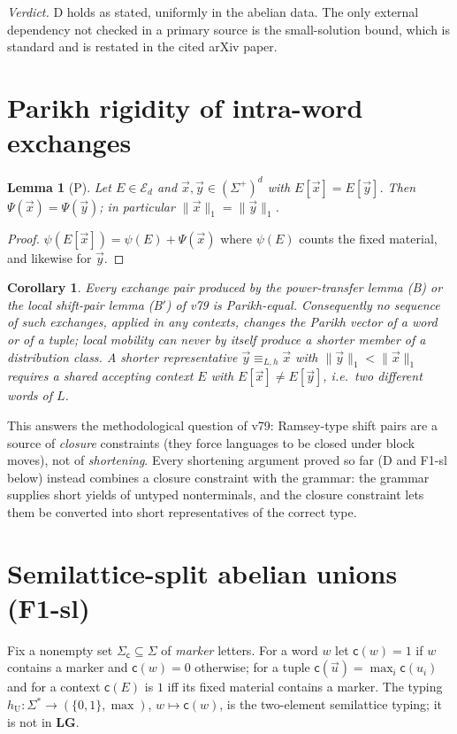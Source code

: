 \documentclass[11pt]{article}
\newtheorem{lemma}[theorem]{Lemma}
\newtheorem{corollary}[theorem]{Corollary}
\theoremstyle{definition}
\theoremstyle{remark}
\newcommand{\tuple}[1]{\vec{#1}}
\newcommand{\mk}{\mathsf c}
\begin{document}
\emph{Verdict.}  D holds as stated, uniformly in the abelian data.  The
only external dependency not checked in a primary source is the
small-solution bound, which is standard and is restated in the cited
arXiv paper.

\section{Parikh rigidity of intra-word exchanges}

\begin{lemma}[P]\label{lem:P}
Let $E\in\mathcal E_d$ and $\tuple x,\tuple y\in(\Sigma^+)^d$ with
$E[\tuple x]=E[\tuple y]$.  Then $\Psi(\tuple x)=\Psi(\tuple y)$; in
particular $\|\tuple x\|_1=\|\tuple y\|_1$.
\end{lemma}
\begin{proof}
$\psi(E[\tuple x])=\psi(E)+\Psi(\tuple x)$ where $\psi(E)$ counts the fixed
material, and likewise for $\tuple y$.
\end{proof}

\begin{corollary}\label{cor:P}
Every exchange pair produced by the power-transfer lemma (B) or the local
shift-pair lemma (B$'$) of v79 is Parikh-equal.  Consequently no sequence of
such exchanges, applied in any contexts, changes the Parikh vector of a
word or of a tuple; local mobility can never by itself produce a shorter
member of a distribution class.  A shorter representative
$\tuple y\equiv_{L,h}\tuple x$ with $\|\tuple y\|_1<\|\tuple x\|_1$ requires
a shared accepting context $E$ with $E[\tuple x]\neq E[\tuple y]$, i.e.\
\emph{two different words} of $L$.
\end{corollary}

This answers the methodological question of v79: Ramsey-type shift pairs are
a source of \emph{closure} constraints (they force languages to be closed
under block moves), not of \emph{shortening}.  Every shortening argument
proved so far (D and F1-sl below) instead combines a closure constraint with
the grammar: the grammar supplies short yields of untyped nonterminals, and
the closure constraint lets them be converted into short representatives of
the correct type.

\section{Semilattice-split abelian unions (F1-sl)}

Fix a nonempty set $\Sigma_{\mk}\subseteq\Sigma$ of \emph{marker} letters.
For a word $w$ let $\mk(w)=1$ if $w$ contains a marker and $\mk(w)=0$
otherwise; for a tuple $\mk(\tuple u)=\max_i\mk(u_i)$ and for a context
$\mk(E)$ is $1$ iff its fixed material contains a marker.  The typing
$h_{\mathrm U}:\Sigma^*\to(\{0,1\},\max)$, $w\mapsto\mk(w)$, is the
two-element semilattice typing; it is not in $\mathbf{LG}$.
\end{document}
